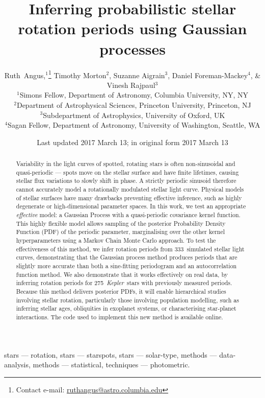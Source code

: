 \documentclass[a4paper,fleqn,usenatbib,useAMS]{mnras}
\title[GP rotation periods]{Inferring probabilistic stellar rotation periods
using Gaussian processes}
\author[R.~Angus \emph{et al.}]{
    Ruth~Angus,$^1$\thanks{Contact e-mail:
\href{mailto:ruthangus@astro.columbia.edu}{ruthangus@astro.columbia.edu}}
    Timothy Morton$^2$,
    Suzanne Aigrain$^3$,
    Daniel Foreman-Mackey$^4$,
    \newauthor
    \& Vinesh Rajpaul$^3$
    \\
    $^1$Simons Fellow, Department of Astronomy, Columbia University, NY, NY \\
    $^2$Department of Astrophysical Sciences, Princeton University,
    Princeton, NJ \\
    $^3$Subdepartment of Astrophysics, University of Oxford, UK \\
    $^4$Sagan Fellow, Department of Astronomy, University of Washington,
    Seattle, WA}
\date{Last updated 2017 March 13; in original form 2017 March 13}
\newcommand{\Kepler}{{\it Kepler}}
\newcommand{\LSST}{{\it LSST}}
\newcommand{\naigrain}{333}
\newcommand{\nkoimcq}{275}
\begin{document}
\label{firstpage}
\pagerange{\pageref{firstpage}--\pageref{lastpage}}
\maketitle

\begin{abstract}
Variability in the light curves of spotted, rotating stars is often
    non-sinusoidal and quasi-periodic --- spots move on the stellar surface
    and have finite lifetimes, causing stellar flux variations to slowly shift
    in phase.
A strictly periodic sinusoid therefore cannot accurately model a rotationally
    modulated stellar light curve.
Physical models of stellar surfaces have many drawbacks preventing effective
    inference, such as highly degenerate or high-dimensional parameter spaces.
In this work, we test an appropriate {\it effective} model: a Gaussian
    Process with a quasi-periodic covariance kernel function.
This highly flexible model allows sampling of the posterior Probability
    Density Function (PDF) of the periodic parameter, marginalising over the
    other kernel hyperparameters using a Markov Chain Monte Carlo approach.
To test the effectiveness of this method, we infer rotation periods from
    \naigrain\ simulated stellar light curves, demonstrating that the Gaussian
    process method produces periods that are slightly more accurate than both
    a sine-fitting periodogram and an autocorrelation function method.
We also demonstrate that it works effectively on real data, by inferring
    rotation periods for \nkoimcq\ \Kepler\ stars with previously measured
    periods.
Because this method delivers posterior PDFs, it will enable hierarchical
    studies involving stellar rotation, particularly those involving
    population modelling, such as inferring stellar ages, obliquities in
    exoplanet systems, or characterising star-planet interactions.
The code used to implement this new method is available online.

\end{abstract}

\begin{keywords}
    stars --- rotation,
    stars --- starspots,
    stars --- solar-type,
    methods --- data-analysis,
    methods --- statistical,
    techniques --- photometric.
\end{keywords}
\end{document}
